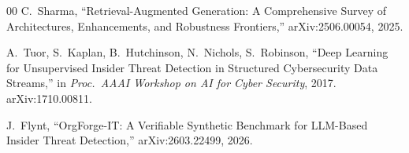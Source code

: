 \documentclass[conference]{IEEEtran}
\begin{document}
\begin{thebibliography}{00}
C.~Sharma,
``Retrieval-Augmented Generation: A Comprehensive Survey of Architectures, Enhancements, and Robustness Frontiers,''
arXiv:2506.00054, 2025.

A.~Tuor, S.~Kaplan, B.~Hutchinson, N.~Nichols, S.~Robinson,
``Deep Learning for Unsupervised Insider Threat Detection in Structured Cybersecurity Data Streams,''
in \textit{Proc.\ AAAI Workshop on AI for Cyber Security}, 2017.
arXiv:1710.00811.

J.~Flynt,
``OrgForge-IT: A Verifiable Synthetic Benchmark for LLM-Based Insider Threat Detection,''
arXiv:2603.22499, 2026.

\end{thebibliography}
\end{document}
